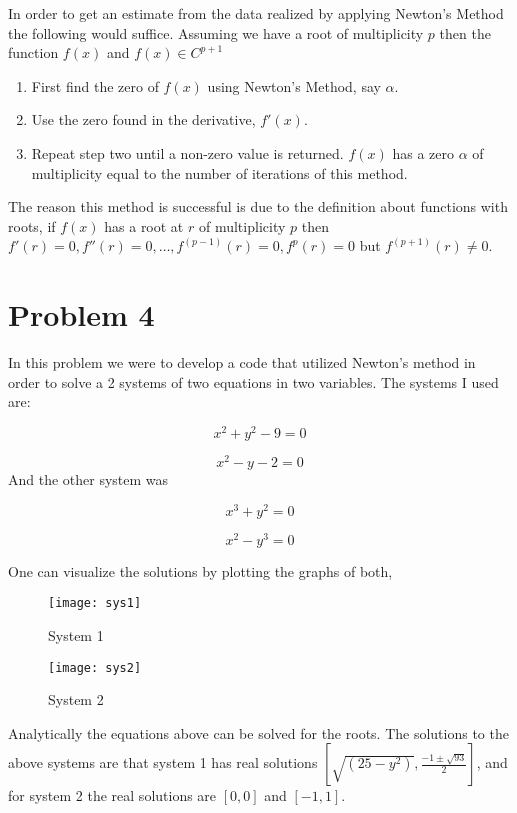 \documentclass[]{article}
\begin{document}
In order to get an estimate from the data realized by applying Newton's Method the following would suffice. Assuming we have a root of multiplicity $ p  $ then the function $ f(x) $ and $  f(x) \in C^{p+1}$ 
\begin{enumerate}
	\item First find the zero of $ f(x) $ using Newton's Method, say $ \alpha $.
	\item Use the zero found in the derivative, $ f'(x) $.
	\item Repeat step two until a non-zero value is returned. $ f(x) $ has a zero $ \alpha $ of multiplicity equal to the number of iterations of this method. 
\end{enumerate}
The reason this method is successful is due to the definition about functions with roots, if $ f(x) $ has a root at $ r $ of multiplicity $ p $ then
$ f'(r) =0, f''(r) = 0, \dots, f^(p-1)(r) = 0 , f^p(r) = 0 $ but $ f^{(p+1)}(r) \neq  0 $.


\section*{Problem 4}
In this problem we were to develop a code that utilized Newton's method in order to solve a 2 systems of two equations in two variables. The systems I used are:

\begin{equation}
x^2 + y^2 -9 = 0
\end{equation}

\begin{equation}
x^2 - y - 2 = 0
\end{equation}
And the other system was	

\begin{equation}
x^3 + y^2 = 0
\end{equation}

\begin{equation}
x^2 - y^3 = 0
\end{equation}

One can visualize the solutions by plotting the graphs of both, 
\begin{figure}
	\centering
	\texttt{[image: sys1]}
	\caption{System 1}
\end{figure}

\begin{figure}
	\centering
	\texttt{[image: sys2]}
	\caption{System 2} 
\end{figure}

Analytically the equations above can be solved for the roots. The solutions to the above systems are that system 1 has real solutions $ [\sqrt{(25- y^2)}, \frac{-1 \pm \sqrt{93}}{2}] $, and for system 2 the real solutions are $ [0,0] $ and $ [-1,1] $. 
\end{document}
